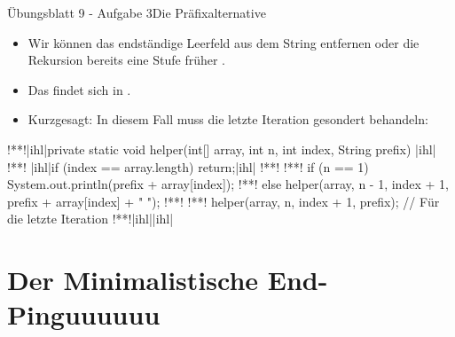 \begin{frame}[fragile]{Übungsblatt 9 - Aufgabe 3\hfill Die Präfixalternative}
    \SetupLstHl{}\begin{itemize}[<+(1)->]
        \item Wir können das endständige Leerfeld aus dem String entfernen oder die Rekursion bereits eine Stufe früher . 
        \item Das findet sich in .
        \item Kurzgesagt: In diesem Fall muss die letzte Iteration gesondert behandeln:
    \end{itemize}
\begin{plainjava}
!**!|ihl|private static void helper(int[] array, int n, int index, String prefix) {|ihl|
!**!    |ihl|if (index == array.length) return;|ihl|
!**!
!**!    if (n == 1) System.out.println(prefix + array[index]);
!**!    else helper(array, n - 1, index + 1, prefix + array[index] + " ");
!**!
!**!    helper(array, n, index + 1, prefix); // Für die letzte Iteration
!**!|ihl|}|ihl|
\end{plainjava}
\end{frame}
\fi

\section{Der Minimalistische End-Pinguuuuuu}
\begin{frame}[c]
    \begin{center}
       \bigskip\par
    \end{center}
\end{frame}
\iffull\fi
